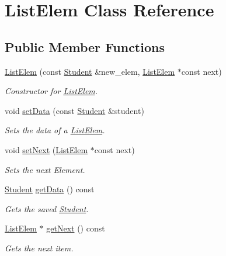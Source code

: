 \hypertarget{class_list_elem}{}\section{List\+Elem Class Reference}
\label{class_list_elem}
\subsection*{Public Member Functions}
\begin{DoxyCompactItemize}
\item 
\hyperlink{class_list_elem_ac8cf55d0466edb81548dbfbfe931adb1}{List\+Elem} (const \hyperlink{class_student}{Student} \&new\+\_\+elem, \hyperlink{class_list_elem}{List\+Elem} $\ast$const next)
\begin{DoxyCompactList}\small\item\em Constructor for \hyperlink{class_list_elem}{List\+Elem}. \end{DoxyCompactList}\item 
void \hyperlink{class_list_elem_a90be95fa85c9fb9ca4470bac30e4d504}{set\+Data} (const \hyperlink{class_student}{Student} \&student)
\begin{DoxyCompactList}\small\item\em Sets the data of a \hyperlink{class_list_elem}{List\+Elem}. \end{DoxyCompactList}\item 
void \hyperlink{class_list_elem_a86b0a61e4fe56fdd0d9f75aec80636fc}{set\+Next} (\hyperlink{class_list_elem}{List\+Elem} $\ast$const next)
\begin{DoxyCompactList}\small\item\em Sets the next Element. \end{DoxyCompactList}\item 
\hyperlink{class_student}{Student} \hyperlink{class_list_elem_af80ce8c80d9e4dfa450d9272c965e110}{get\+Data} () const
\begin{DoxyCompactList}\small\item\em Gets the saved \hyperlink{class_student}{Student}. \end{DoxyCompactList}\item 
\hyperlink{class_list_elem}{List\+Elem} $\ast$ \hyperlink{class_list_elem_ac615618c96d2bacc597ba59a4e8e2620}{get\+Next} () const
\begin{DoxyCompactList}\small\item\em Gets the next item. \end{DoxyCompactList}\end{DoxyCompactItemize}


